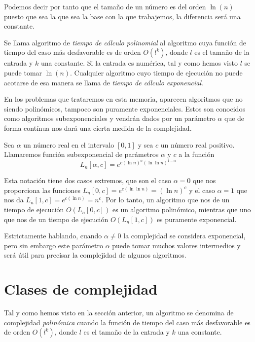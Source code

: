 Podemos decir por tanto que el tama\~no de un n\'umero es del orden $\ln(n)$ puesto que sea la que sea la base con la que trabajemos, la diferencia ser\'a una constante.

\begin{definition}
Se llama algoritmo de \textit{tiempo de cálculo polinomial} al algoritmo cuya función de tiempo del caso más desfavorable es de orden
$O(l^k)$, donde $l$ es el tamaño de la entrada y $k$ una constante. Si la entrada es num\'erica, tal y como hemos visto $l$ se puede tomar $\ln(n)$.
Cualquier algoritmo cuyo tiempo de ejecución no puede acotarse de esa manera se llama de \textit{tiempo de cálculo exponencial}.
\end{definition}

En los problemas que trataremos en esta memoria, aparecen algoritmos que no siendo polin\'omicos, tampoco son puramente exponenciales.
Estos son conocidos como algoritmos subexponenciales y vendr\'an dados por un par\'ametro $\alpha$ que de forma cont\'inua nos dar\'a una cierta
medida de la complejidad.

\begin{definition}
Sea $\alpha$ un n\'umero real en el intervalo $[0,1]$ y sea $c$ un n\'umero real positivo. Llamaremos funci\'on subexponencial de par\'ametros
$\alpha$ y $c$ a la funci\'on
\[ L_n[\alpha,c] = e^{c(\ln n)^\alpha (\ln \ln n)^{1-\alpha}} \]
\end{definition}

Esta notaci\'on tiene dos casos extremos, que son el caso $\alpha = 0$ que nos proporciona las funciones $L_n[0,c] = e^{c(\ln\ln n)} =(\ln n)^c$ y el
caso $\alpha = 1$ que nos da $L_n[1,c] = e^{c(\ln n)} = n^c$. Por lo tanto, un algoritmo que nos de un tiempo de ejecuci\'on $O(L_n[0,c])$ es un
algoritmo polin\'omico, mientras que uno que nos de un tiempo de ejecuci\'on $O(L_n[1,c])$ es puramente exponencial.

Estrictamente hablando, cuando $\alpha \not= 0$ la complejidad se considera exponencial, pero
sin embargo este par\'ametro $\alpha$ puede tomar muchos valores intermedios y ser\'a \'util para precisar la complejidad
de algunos algoritmos.

\section{Clases de complejidad}

Tal y como hemos visto en la secci\'on anterior, un algoritmo se denomina de complejidad {\em polin\'omica}
cuando la función de tiempo del caso más desfavorable es de orden $O(l^k)$, donde $l$ es el tamaño de la entrada y $k$ una constante.


